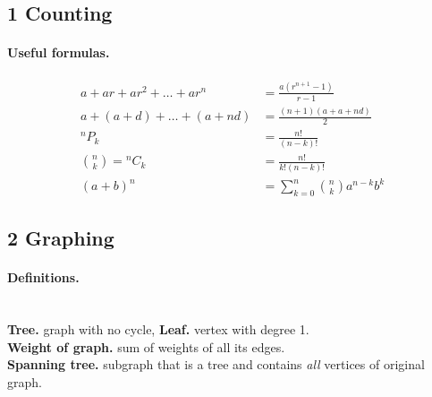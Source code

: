 \documentclass[11pt,twocolumn]{scrartcl}
\begin{document}

\subsection*{1 Counting}
\paragraph{Useful formulas.}
\begin{align*}
    a + ar + ar^2 + \dots + ar^n &= \frac{a(r^{n+1} - 1)}{r - 1} \\
    a + (a+d) + \dots + (a+nd) &= \frac{(n+1)(a+a+nd)}{2} 	\\
    ^nP_k &= \frac{n!}{(n-k)!}		\\
    \binom{n}{k} = {}^nC_k &= \frac{n!}{k!(n-k)!}	\\
    \left(a+b\right)^n &= \sum_{k=0}^n \binom{n}{k} a^{n-k}b^k
\end{align*}

\subsection*{2 Graphing}
\paragraph{Definitions.}\hfill\\
\textbf{Tree.} graph with no cycle,
    \textbf{Leaf.} vertex with degree 1. \\
\textbf{Weight of graph.} sum of weights of all its edges.  \\
\textbf{Spanning tree.} subgraph that is a tree and contains \emph{all} vertices of original graph.
\end{document}
